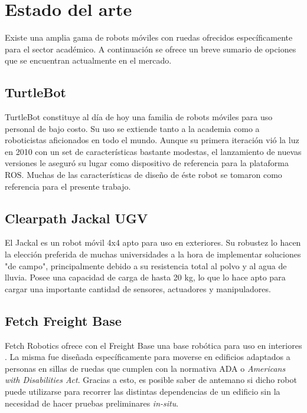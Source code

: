 \section{Estado del arte}

Existe una amplia gama de robots móviles con ruedas ofrecidos específicamente para el sector académico. A continuación se ofrece un breve sumario de opciones que se encuentran actualmente en el mercado.
\subsection{TurtleBot}

TurtleBot constituye al día de hoy una familia de robots móviles para uso personal de bajo costo. Su uso se extiende tanto a la academia como a roboticistas aficionados en todo el mundo.\newline
Aunque su primera iteración vió la luz en 2010 con un set de características bastante modestas, el lanzamiento de nuevas versiones le aseguró su lugar como dispositivo de referencia para la plataforma ROS. \newline
Muchas de las características de diseño de éste robot se tomaron como referencia para el presente trabajo.

\subsection{Clearpath Jackal UGV}

El Jackal es un robot móvil 4x4 apto para uso en exteriores. Su robustez lo hacen la elección preferida de muchas universidades a la hora de implementar soluciones "de campo", principalmente debido a su resistencia total al polvo y al agua de lluvia. Posee una capacidad de carga de hasta 20 kg, lo que lo hace apto para cargar una importante cantidad de sensores, actuadores y manipuladores.

\subsection{Fetch Freight Base}

Fetch Robotics ofrece con el Freight Base una base robótica para uso en interiores \citep{PAPER:1}. La misma fue diseñada específicamente para moverse en edificios adaptados a personas en sillas de ruedas que cumplen con la normativa ADA o \textit{Americans with Disabilities Act}. Gracias a esto, es posible saber de antemano si dicho robot puede utilizarse para recorrer las distintas dependencias de un edificio sin la necesidad de hacer pruebas preliminares \textit{in-situ}.

